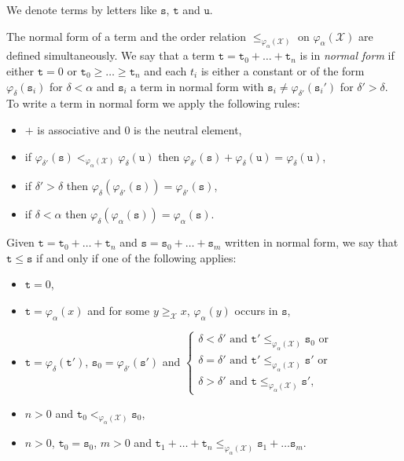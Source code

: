 \documentclass[11pt]{amsart}
\theoremstyle{definition}
\theoremstyle{remark}
\theoremstyle{plain}
\def\X{\mathcal{X}}
\def\a{\alpha}
\def\d{\delta}
\begin{document}
We denote terms by letters like $\mathtt{s}$, $\mathtt{t}$ and $\mathtt{u}$.

The normal form of a term and the order relation $\le_{\varphi_\a(\X)}$ on $\varphi_\a(\X)$ are defined simultaneously.
We say that a term $\mathtt{t} = \mathtt{t}_0 + \ldots + \mathtt{t}_n$ is in \textit{normal form} if either $\mathtt{t} = 0$ or $\mathtt{t}_0 \ge \ldots \ge \mathtt{t}_n$ and each $t_i$ is either a constant or of the form $\varphi_\d(\mathtt{s}_i)$ for $\d < \a$ and $\mathtt{s}_i$ a term in normal form with $\mathtt{s}_i \ne \varphi_{\d'}(\mathtt{s}_i')$ for $\d' > \d$.
To write a term in normal form we apply the following rules:
\begin{itemize}
    \item $+$ is associative and $0$ is the neutral element,
    \item if $\varphi_{\d'}(\mathtt{s}) <_{\varphi_\a(\X)} \varphi_\d(\mathtt{u})$ then $\varphi_{\d'}(\mathtt{s}) + \varphi_\d(\mathtt{u}) = \varphi_\d(\mathtt{u})$,
    \item if $\d'>\d$ then $\varphi_\d (\varphi_{\d'}(\mathtt{s})) = \varphi_{\d'}(\mathtt{s})$,
    \item if $\d < \a$ then $\varphi_\d(\varphi_\a(\mathtt{s})) = \varphi_\a(\mathtt{s})$.
\end{itemize}

Given $\mathtt{t} = \mathtt{t}_0+\ldots+\mathtt{t}_n$ and $\mathtt{s}=\mathtt{s}_0+\ldots+\mathtt{s}_m$ written in normal form, we say that $\mathtt{t} \le \mathtt{s}$ if and only if one of the following applies:
\begin{itemize}
    \item $\mathtt{t}=0$,
    \item $\mathtt{t} = \varphi_\a(x)$ and for some $y \ge_\X x$, $\varphi_\a(y)$ occurs in $\mathtt{s}$,
    \item $\mathtt{t} = \varphi_\d(\mathtt{t}')$, $\mathtt{s}_0 = \varphi_{\d'}(\mathtt{s}')$ and 
    $\begin{cases}
    \d < \d' \text{ and } \mathtt{t}' \le_{\varphi_\a(\X)} \mathtt{s}_0 \text{ or } \\
    \d = \d' \text{ and } \mathtt{t}' \le_{\varphi_\a(\X)} \mathtt{s}' \text{ or } \\
    \d > \d' \text{ and } \mathtt{t} \le_{\varphi_\a(\X)} \mathtt{s}',
    \end{cases}$
    \item $n > 0$ and $\mathtt{t}_0 <_{\varphi_\a(\X)} \mathtt{s}_0$,
    \item $n > 0$, $\mathtt{t}_0 = \mathtt{s}_0$, $m > 0$ and $\mathtt{t}_1 + \ldots +\mathtt{t}_n \le_{\varphi_\a(\X)} \mathtt{s}_1 + \ldots \mathtt{s}_m$.
\end{itemize}
\end{document}
